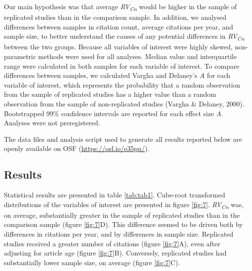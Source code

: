 \documentclass[
  english,
  man,floatsintext]{apa6}
\begin{document}
Our main hypothesis was that average \emph{RV\textsubscript{Cn}} would be higher in the sample of replicated studies than in the comparison sample. In addition, we analysed differences between samples in citation count, average citations per year, and sample size, to better understand the causes of any potential differences in \emph{RV\textsubscript{Cn}} between the two groups. Because all variables of interest were highly skewed, non-parametric methods were used for all analyses. Median value and interquartile range were calculated in both samples for each variable of interest. To compare differences between samples, we calculated Vargha and Delaney's \emph{A} for each variable of interest, which represents the probability that a random observation from the sample of replicated studies has a higher value than a random observation from the sample of non-replicated studies (Vargha \& Delaney, 2000). Bootstrapped 99\% confidence intervals are reported for each effect size \emph{A}. Analyses were not preregistered.

The data files and analysis script used to generate all results reported below are openly available on OSF (\url{https://osf.io/e35pu/}).

\hypertarget{results}{%
\subsection{Results}\label{results}}

Statistical results are presented in table \ref{tab:tab1}. Cube-root transformed distributions of the variables of interest are presented in figure \ref{fig:7}. \emph{RV\textsubscript{Cn}} was, on average, substantially greater in the sample of replicated studies than in the comparison sample (figure \ref{fig:7}D). This difference seemed to be driven both by differences in citations per year, and by differences in sample size. Replicated studies received a greater number of citations (figure \ref{fig:7}A), even after adjusting for article age (figure \ref{fig:7}B). Conversely, replicated studies had substantially lower sample size, on average (figure \ref{fig:7}C).
\end{document}
